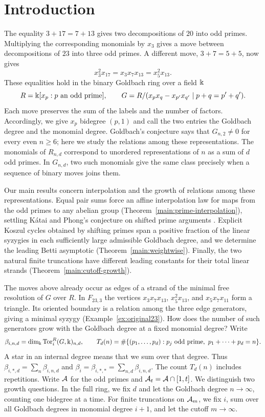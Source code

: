 \section{Introduction}
\label{sec:introduction}

The equality $3+17=7+13$ gives two decompositions of $20$ into odd
primes. Multiplying the corresponding monomials by $x_3$ gives a move
between decompositions of $23$ into three odd primes. A different move,
$3+7=5+5$, now gives
\[
 x_3^2x_{17}=x_3x_7x_{13}=x_5^2x_{13}.
\]
These equalities hold in the binary Goldbach ring over a field $\Bbbk$
\[
 R=\Bbbk[x_p:p\text{ an odd prime}],\qquad
 G=R/(x_px_q-x_{p'}x_{q'}\mid p+q=p'+q').
\]
Each move preserves the sum of the labels and the number of factors.
Accordingly, we give $x_p$ bidegree $(p,1)$ and call the two entries
the Goldbach degree and the monomial degree.
Goldbach's conjecture says that $G_{n,2}\ne0$ for every even $n\ge6$;
here we study the relations among these representations.
The monomials of $R_{n,d}$ correspond to unordered representations
of $n$ as a sum of $d$ odd primes. In $G_{n,d}$, two such monomials
give the same class precisely when a sequence of binary moves joins them.

Our main results concern interpolation and the growth of relations
among these representations. Equal pair sums force an affine
interpolation law for maps from the odd primes to any abelian group
(Theorem~\ref{main:prime-interpolation}), settling K\'atai and Phong's
conjecture on shifted prime arguments \cite[Conj.~6]{KP15Problems}.
Explicit Koszul cycles obtained by shifting primes span a positive
fraction of the linear syzygies in each sufficiently large admissible
Goldbach degree, and we determine the leading Betti asymptotic
(Theorem~\ref{main:weightwise}). Finally, the two natural finite
truncations have different leading constants for their total linear
strands (Theorem~\ref{main:cutoff-growth}).

The moves above already occur as edges of a strand of the minimal free
resolution of $G$ over $R$. In $F_{23,3}$ the vertices $x_3x_7x_{13}$,
$x_5^2x_{13}$, and $x_5x_7x_{11}$ form a triangle. Its oriented boundary
is a relation among the three edge generators, giving a minimal syzygy
(Example~\ref{ex:original23}). How does the number of such generators
grow with the Goldbach degree at a fixed monomial degree? Write
\[
 \beta_{i,n,d}=\dim_\Bbbk\operatorname{Tor}_i^R(G,\Bbbk)_{n,d},\qquad
 T_d(n)=\#\{(p_1,\ldots,p_d):p_j\text{ odd prime},\
                                  p_1+\cdots+p_d=n\}.
\]
A star in an internal degree means that we sum over that degree. Thus
$\beta_{i,*,d}=\sum_n\beta_{i,n,d}$ and
$\beta_i=\beta_{i,*,*}=\sum_{n,d}\beta_{i,n,d}$.
The count $T_d(n)$ includes repetitions. Write $\mathcal A$ for the odd primes
and $\mathcal A_t=\mathcal A\cap[1,t]$. We distinguish two growth questions. In the
full ring, we fix $d$ and let the Goldbach degree $n\to\infty$,
counting one bidegree at a time. For finite truncations on $\mathcal A_m$,
we fix $i$, sum over all Goldbach degrees in monomial degree $i+1$,
and let the cutoff $m\to\infty$.

